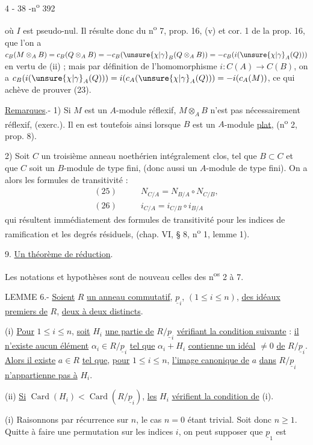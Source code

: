 \begin{center}4 - 38 -\hfill n\textsuperscript{o} 392\end{center}

où $I$ est pseudo-nul. Il résulte donc du n\textsuperscript{o} 7, prop. 16, (v) et cor. 1 de la prop. 16, que l'on a $c_B(M\otimes_A B)=c_B(Q\otimes_A B)=-c_B(\unsure{\chi|\gamma}_B(Q\otimes_A B))=-c_B(i(\unsure{\chi|\gamma}_A(Q)))$ en vertu de (ii) ; mais par définition de l'homomorphisme $i:C(A)\longrightarrow C(B)$, on a $c_B(i(\unsure{\chi|\gamma}_A(Q)))=i(c_A(\unsure{\chi|\gamma}_A(Q)))=-i(c_A(M))$, ce qui achève de prouver (23).

\uline{Remarques}.- 1) Si $M$ est un $A$-module réflexif, $M\otimes_A B$ n'est pas nécessairement réflexif, (exerc.\quad). Il en est toutefois ainsi lorsque $B$ est un $A$-module \uline{plat}, (n\textsuperscript{o} 2, prop. 8).

2) Soit $C$ un troisième anneau noethérien intégralement clos, tel que $B\subset C$ et que $C$ soit un $B$-module de type fini, (donc aussi un $A$-module de type fini). On a alors les formules de transitivité :
\[
\begin{aligned}
(25)\qquad &N_{C/A}=N_{B/A}\circ N_{C/B},\\
(26)\qquad &i_{C/A}=i_{C/B}\circ i_{B/A}
\end{aligned}
\]
qui résultent immédiatement des formules de transitivité pour les indices de ramification et les degrés résiduels, (chap. VI, § 8, n\textsuperscript{o} 1, lemme 1).

9. \uline{Un théorème de réduction}.

Les notations et hypothèses sont de nouveau celles des n\textsuperscript{os} 2 à 7.

LEMME 6.- \uline{Soient} $R$ \uline{un anneau commutatif}, $\underline{p}_i$, $(1\le i\le n)$, \uline{des idéaux premiers de} $R$, \uline{deux à deux distincts}.

(i) \uline{Pour} $1\le i\le n$, \uline{soit} $H_i$ \uline{une partie de} $R/\underline{p}_i$ \uline{vérifiant la condition suivante} : \uline{il n'existe aucun élément} $\alpha_i\in R/\underline{p}_i$ \uline{tel que} $\alpha_i+H_i$ \uline{contienne un idéal} $\ne0$ \uline{de} $R/\underline{p}_i$. \uline{Alors il existe} $a\in R$ \uline{tel que}, \uline{pour} $1\le i\le n$, \uline{l'image canonique de} $a$ \uline{dans} $R/\underline{p}_i$ \uline{n'appartienne pas à} $H_i$.

(ii) \uline{Si} $\operatorname{Card}(H_i)<\operatorname{Card}(R/\underline{p}_i)$, \uline{les} $H_i$ \uline{vérifient la condition de} (i).

(i) Raisonnons par récurrence sur $n$, le cas $n=0$ étant trivial. Soit donc $n\ge1$. Quitte à faire une permutation sur les indices $i$, on peut supposer que $\underline{p}_1$ est

